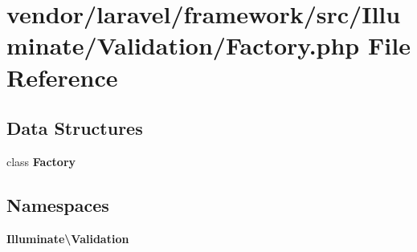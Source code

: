 \section{vendor/laravel/framework/src/\+Illuminate/\+Validation/\+Factory.php File Reference}
\label{laravel_2framework_2src_2_illuminate_2_validation_2_factory_8php}
\subsection*{Data Structures}
\begin{DoxyCompactItemize}
\item 
class {\bf Factory}
\end{DoxyCompactItemize}
\subsection*{Namespaces}
\begin{DoxyCompactItemize}
\item 
 {\bf Illuminate\textbackslash{}\+Validation}
\end{DoxyCompactItemize}
